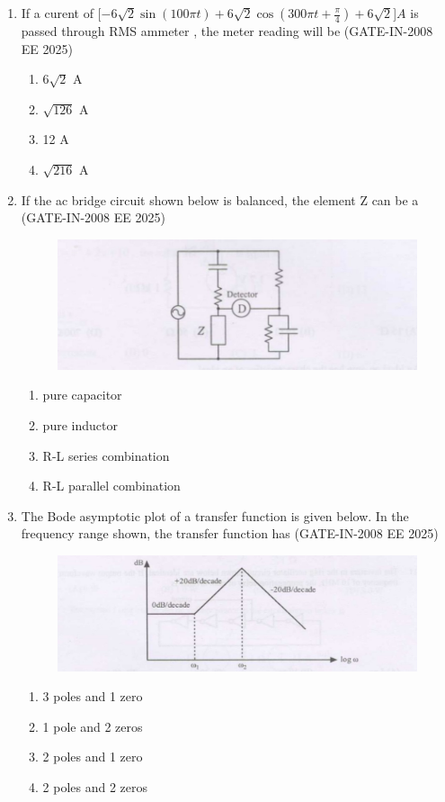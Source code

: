 \documentclass[journal,12pt,onecolumn]{IEEEtran}
\theoremstyle{remark}
\begin{document}
\begin{enumerate}[label=Q.\arabic*,start=1]
    \item If a curent of [$-6\sqrt{2}\sin(100{\pi}t) +6\sqrt{2}\cos(300{\pi}t + \frac{\pi}{4}) + 6\sqrt{2}$]$A$ is passed through RMS ammeter , the meter reading will be (GATE-IN-2008 EE 2025) 
    \begin{enumerate} 
        \item $6\sqrt{2}$ A
        \item $\sqrt{126}$ A
        \item 12 A
        \item $\sqrt{216}$ A
    \end{enumerate}
    
    \item If the ac bridge circuit shown below is balanced, the element Z can be a  (GATE-IN-2008 EE 2025)

\begin{figure}[H]
    \centering
    \includegraphics[width=0.5\linewidth]{figs/i5.jpg}
    \label{fig:placeholder5}
\end{figure}
    
    \begin{enumerate} 
        \item pure capacitor
        \item pure inductor
        \item R-L series combination
        \item R-L parallel combination
    \end{enumerate}
    
    \item The Bode asymptotic plot of a transfer function is given below. In the frequency range shown, the
transfer function has (GATE-IN-2008 EE 2025)

\begin{figure}[H]
    \centering
    \includegraphics[width=0.5\linewidth]{figs/i6.jpg}
    \label{fig:placeholder6}
\end{figure}
    \begin{enumerate} 
        \item 3 poles and 1 zero 
        \item 1 pole and 2 zeros
        \item 2 poles and 1 zero 
        \item 2 poles and 2 zeros
    \end{enumerate}
    

\end{enumerate}
\end{document}
